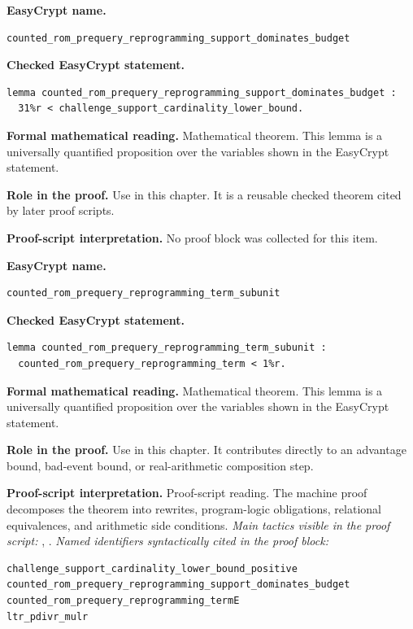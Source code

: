 \begin{formaltheorem}
\noindent\textbf{EasyCrypt name.}
\begin{lstlisting}[language=EasyCrypt,basicstyle=\ttfamily\scriptsize]
counted_rom_prequery_reprogramming_support_dominates_budget
\end{lstlisting}
\noindent\textbf{Checked EasyCrypt statement.}
\begin{lstlisting}[language=EasyCrypt,basicstyle=\ttfamily\scriptsize]
lemma counted_rom_prequery_reprogramming_support_dominates_budget :
  31%r < challenge_support_cardinality_lower_bound.
\end{lstlisting}
\noindent\textbf{Formal mathematical reading.}
Mathematical theorem. This lemma is a universally quantified proposition over the variables shown in the EasyCrypt statement.

\noindent\textbf{Role in the proof.}
Use in this chapter. It is a reusable checked theorem cited by later proof scripts.

\noindent\textbf{Proof-script interpretation.}
No proof block was collected for this item.

\end{formaltheorem}

\begin{formaltheorem}
\noindent\textbf{EasyCrypt name.}
\begin{lstlisting}[language=EasyCrypt,basicstyle=\ttfamily\scriptsize]
counted_rom_prequery_reprogramming_term_subunit
\end{lstlisting}
\noindent\textbf{Checked EasyCrypt statement.}
\begin{lstlisting}[language=EasyCrypt,basicstyle=\ttfamily\scriptsize]
lemma counted_rom_prequery_reprogramming_term_subunit :
  counted_rom_prequery_reprogramming_term < 1%r.
\end{lstlisting}
\noindent\textbf{Formal mathematical reading.}
Mathematical theorem. This lemma is a universally quantified proposition over the variables shown in the EasyCrypt statement.

\noindent\textbf{Role in the proof.}
Use in this chapter. It contributes directly to an advantage bound, bad-event bound, or real-arithmetic composition step.

\noindent\textbf{Proof-script interpretation.}
Proof-script reading. The machine proof decomposes the theorem into rewrites, program-logic obligations, relational equivalences, and arithmetic side conditions.
\emph{Main tactics visible in the proof script:} , .
\emph{Named identifiers syntactically cited in the proof block:}
\begin{lstlisting}[language=EasyCrypt,basicstyle=\ttfamily\scriptsize]
challenge_support_cardinality_lower_bound_positive
counted_rom_prequery_reprogramming_support_dominates_budget
counted_rom_prequery_reprogramming_termE
ltr_pdivr_mulr
\end{lstlisting}

\end{formaltheorem}


